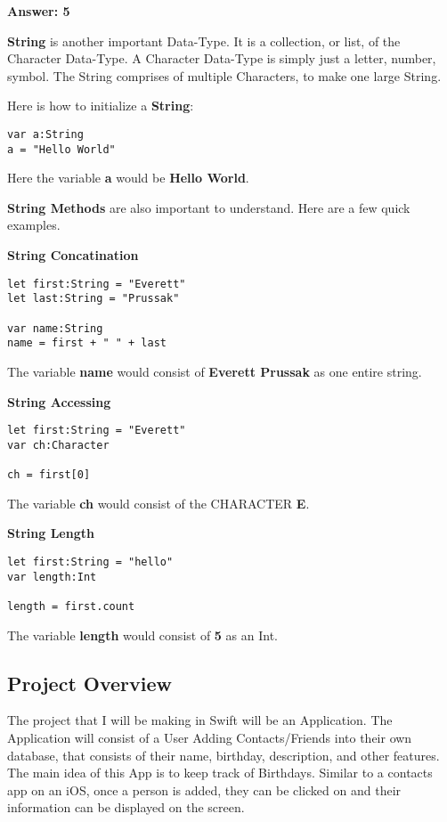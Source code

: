 \documentclass{article}
\theoremstyle{theorem}
\theoremstyle{definition}
\theoremstyle{remark}
\begin{document}
\noindent\newline\textbf{Answer: 5}


\noindent\newline\newline\textbf{String} is another important Data-Type. It is a collection, or list, of the Character Data-Type. A Character Data-Type is simply just a letter, number, symbol. The String comprises of multiple Characters, to make one large String.

\noindent\newline Here is how to initialize a \textbf{String}:
\begin{verbatim}
var a:String
a = "Hello World"
\end{verbatim}

\noindent\newline Here the variable \textbf{a} would be \textbf{Hello World}. 

\noindent\newline\textbf{String Methods} are also important to understand. Here are a few quick examples.

\noindent\newline \textbf{String Concatination}
\begin{verbatim}
let first:String = "Everett"
let last:String = "Prussak"

var name:String
name = first + " " + last
\end{verbatim}
\noindent\newline The variable \textbf{name} would consist of \textbf{Everett Prussak} as one entire string.

\noindent\newline \textbf{String Accessing}
\begin{verbatim}
let first:String = "Everett"
var ch:Character

ch = first[0]
\end{verbatim}
\noindent\newline The variable \textbf{ch} would consist of the CHARACTER \textbf{E}.

\noindent\newline \textbf{String Length}
\begin{verbatim}
let first:String = "hello"
var length:Int

length = first.count
\end{verbatim}
\noindent\newline The variable \textbf{length} would consist of \textbf{5} as an Int.

\subsection{Project Overview}
The project that I will be making in Swift will be an Application. The Application will consist of a User Adding Contacts/Friends into their own database, that consists of their name, birthday, description, and other features. The main idea of this App is to keep track of Birthdays. Similar to a contacts app on an iOS, once a person is added, they can be clicked on and their information can be displayed on the screen. 
\end{document}
